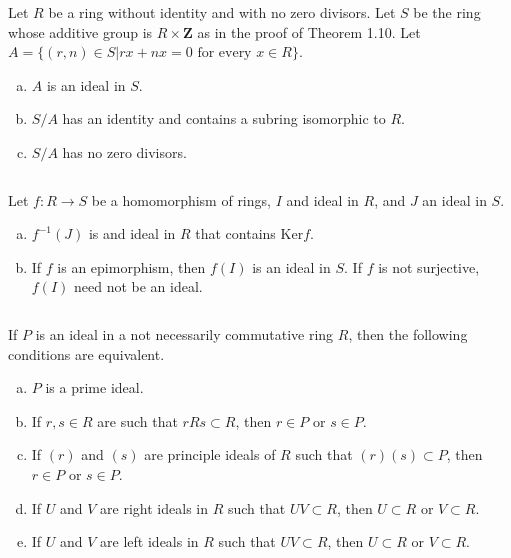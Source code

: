 $$ $$

\begin{ex}
    Let $R$ be a ring without identity and with no zero divisors. Let $S$ be the ring whose additive group is $R\times \mathbf{Z}$ as in the proof of Theorem 1.10. Let $A=\{(r,n)\in S|rx+nx=0 \text{ for every }x\in R\}$.
    \begin{enumerate}[(a)]
        \item $A$ is an ideal in $S$.
        \item $S /A$ has an identity and contains a subring isomorphic to $R$.
        \item $S /A$ has no zero divisors.
    \end{enumerate}
\end{ex}

$$ $$

\begin{ex}
    Let $f:R\to S$ be a homomorphism of rings, $I$ and ideal in $R$, and $J$ an ideal in $S$.
    \begin{enumerate}[(a)]
        \item $f^{-1}(J)$ is and ideal in $R$ that contains $\mathrm{Ker}f$.
        \item If $f$ is an epimorphism, then $f(I)$ is an ideal in $S$. If $f$ is not surjective, $f(I)$ need not be an ideal.
    \end{enumerate}
\end{ex}

$$ $$

\begin{ex}
    If $P$ is an ideal in a not necessarily commutative ring $R$, then the following conditions are equivalent.
    \begin{enumerate}[(a)]
        \item $P$ is a prime ideal.
        \item If $r,s\in R$ are such that $rRs\subset R$, then $r\in P$ or $s\in P$.
        \item If $(r)$ and $(s)$ are principle ideals of $R$ such that $(r)(s)\subset P$, then $r\in P$ or $s\in P$.
        \item If $U$ and $V$ are right ideals in $R$ such that $UV\subset R$, then $U\subset R$ or $V\subset R$.
        \item If $U$ and $V$ are left ideals in $R$ such that $UV\subset R$, then $U\subset R$ or $V\subset R$.
    \end{enumerate}
\end{ex}

$$ $$

